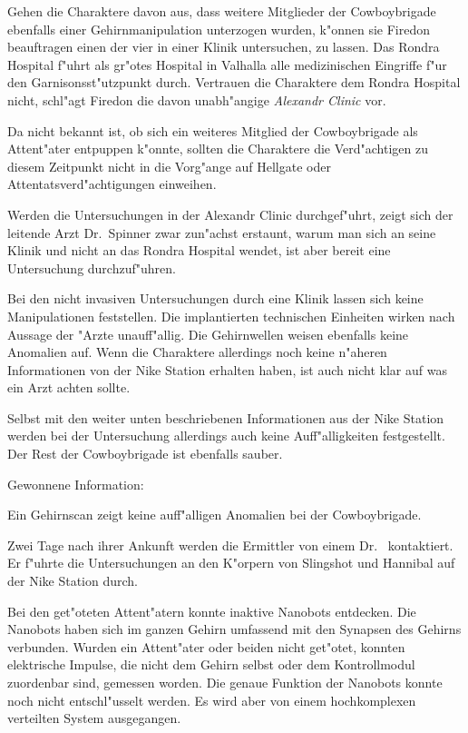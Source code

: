 
Gehen die Charaktere davon aus, dass weitere Mitglieder der Cowboybrigade ebenfalls einer Gehirnmanipulation unterzogen wurden, k"onnen sie Firedon beauftragen einen der vier in einer Klinik untersuchen, zu lassen. Das Rondra Hospital f"uhrt als gr"o\3tes Hospital in Valhalla alle medizinischen Eingriffe f"ur den Garnisonsst"utzpunkt durch. Vertrauen die Charaktere dem Rondra Hospital nicht, schl"agt Firedon die davon unabh"angige \emph{Alexandr Clinic} vor. 

Da nicht bekannt ist, ob sich ein weiteres Mitglied der Cowboybrigade als Attent"ater entpuppen k"onnte, sollten die Charaktere die Verd"achtigen zu diesem Zeitpunkt nicht in die Vorg"ange auf Hellgate oder Attentatsverd"achtigungen einweihen.

Werden die Untersuchungen in der Alexandr Clinic durchgef"uhrt, zeigt sich der leitende Arzt Dr.~Spinner zwar zun"achst erstaunt, warum man sich an seine Klinik und nicht an das Rondra Hospital wendet, ist aber bereit eine Untersuchung durchzuf"uhren. 

Bei den nicht invasiven Untersuchungen durch eine Klinik lassen sich keine Manipulationen feststellen. Die implantierten technischen Einheiten wirken nach Aussage der "Arzte unauff"allig. Die Gehirnwellen weisen ebenfalls keine Anomalien auf. Wenn die Charaktere allerdings noch keine n"aheren Informationen von der Nike Station erhalten haben, ist auch nicht klar auf was ein Arzt achten sollte. 

Selbst mit den weiter unten beschriebenen Informationen aus der Nike Station werden bei der Untersuchung allerdings auch keine Auff"alligkeiten festgestellt. Der Rest der Cowboybrigade ist ebenfalls sauber.

\begin{remarks}
	Gewonnene Information: 
	
	Ein Gehirnscan zeigt keine auff"alligen Anomalien bei der Cowboybrigade.	
\end{remarks}


Zwei Tage nach ihrer Ankunft werden die Ermittler von einem Dr.~  kontaktiert. Er f"uhrte die Untersuchungen an den K"orpern von Slingshot und Hannibal auf der Nike Station durch. 

Bei den get"oteten Attent"atern konnte   inaktive Nanobots entdecken. Die Nanobots haben sich im ganzen Gehirn umfassend mit den Synapsen des Gehirns verbunden. Wurden ein Attent"ater oder beiden nicht get"otet, konnten elektrische Impulse, die nicht dem Gehirn selbst oder dem Kontrollmodul zuordenbar sind, gemessen worden. Die genaue Funktion der Nanobots konnte noch nicht entschl"usselt werden. Es wird aber von einem hochkomplexen verteilten System ausgegangen.

